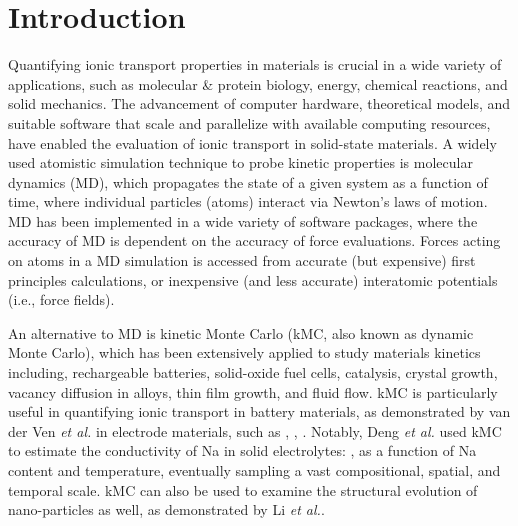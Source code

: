 \documentclass[a4paper,fleqn]{cas-dc}
\begin{document}
\section{Introduction}\label{sec:intro}
\noindent Quantifying ionic transport properties in materials is crucial in a wide variety of applications, such as molecular \& protein biology\cite{mccammon_dynamics_1977,karplus_molecular_2005,klepeis_long-timescale_2009}, energy\cite{ong_electrochemical_2011,mo_insights_2014,wang_design_2015}, chemical reactions\cite{herschbach_molecular_1987,craig_chemical_2005}, and solid mechanics.\cite{lutsko_stress_1988,abraham_molecular_1997,yang_multiscale_2006,rafii-tabar_molecular_2006} The advancement of computer hardware, theoretical models, and suitable software that scale and parallelize with available computing resources, have  enabled the evaluation of ionic transport in solid-state materials.\cite{frenkel_understanding_2002,balluffi_kinetics_2005} A widely used atomistic simulation technique to probe kinetic properties is molecular dynamics (MD),\cite{frenkel_understanding_2002,hansson_molecular_2002} which propagates the state of a given system as a function of time, where individual particles (atoms) interact via Newton's laws of motion. MD has been implemented in a wide variety of software packages\cite{thompson_lammps_2022,te_velde_chemistry_2001,phillips_scalable_2020,apra_nwchem_2020,salomon-ferrer_overview_2013,kuhne_cp2k_2020}, where the accuracy of MD is dependent on the accuracy of force evaluations. Forces acting on atoms in a MD simulation is accessed from accurate (but expensive) first principles calculations, or inexpensive (and less accurate) interatomic potentials (i.e., force fields).

An alternative to MD is kinetic Monte Carlo (kMC, also known as dynamic Monte Carlo)\cite{bortz_new_1975,gillespie_general_1976,gillespie_exact_1977}, which has  been extensively applied to study materials kinetics including, rechargeable batteries\cite{van_der_ven_first-principles_2001,van_der_ven_rechargeable_2020,xiao_kinetic_2018,deng_fundamental_2022}, solid-oxide fuel cells\cite{pornprasertsuk_kinetic_2009,modak_kinetic_2005},  catalysis\cite{Andersen2019,pineda_kinetic_2022}, crystal growth\cite{huang_mechanism_2017},  vacancy diffusion in alloys\cite{evteev_shrinking_2008,li_predicting_2021}, thin film growth\cite{han_development_2007}, and fluid flow\cite{apostolopoulou_kinetic_2017}. kMC is particularly useful in quantifying ionic transport in battery materials, as demonstrated by van der Ven \textit{et al.} in electrode materials, such as \cite{van_der_ven_first-principles_2001}, \cite{van_der_ven_nondilute_2008}, \cite{bhattacharya_phase_2010}.  Notably, Deng \textit{et al.}\cite{deng_fundamental_2022} used kMC to estimate the conductivity of Na in solid electrolytes: , as a function of Na content and temperature, eventually sampling a vast compositional, spatial, and temporal scale. kMC can also be used to examine the structural evolution of nano-particles as well, as demonstrated by Li \textit{et al.}{\cite{li_predicting_2021}}.
\end{document}
